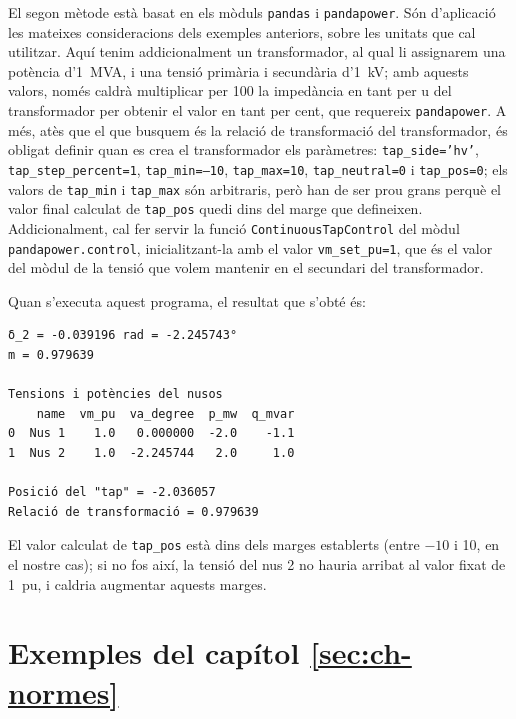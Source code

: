 El segon mètode està basat en els mòduls \texttt{pandas} i \texttt{pandapower}. Són d'aplicació les mateixes consideracions dels exemples anteriors, sobre les unitats que cal utilitzar. Aquí tenim addicionalment un transformador, al qual li assignarem una potència d'\qty{1}{MVA}, i una tensió primària i secundària d'\qty{1}{kV}; amb aquests valors, només caldrà multiplicar per 100 la impedància en tant per u  del transformador per obtenir el valor en tant per cent, que requereix \texttt{pandapower}. A més, atès que el que busquem és la relació de transformació del transformador, és obligat definir quan es crea el transformador els paràmetres: \texttt{tap\_side='hv'}, \texttt{tap\_step\_percent=1}, \texttt{tap\_min=--10}, \texttt{tap\_max=10}, \texttt{tap\_neutral=0} i  \texttt{tap\_pos=0}; els valors de \texttt{tap\_min} i \texttt{tap\_max} són arbitraris, però han de ser prou grans perquè el valor final calculat de \texttt{tap\_pos} quedi dins del marge que defineixen. Addicionalment, cal fer servir la funció \texttt{ContinuousTapControl} del mòdul \texttt{pandapower.control}, inicialitzant-la amb el valor \texttt{vm\_set\_pu=1}, que és el valor del mòdul de la tensió que volem mantenir en el secundari del transformador.




Quan s'executa aquest programa, el resultat que s'obté és:
\lstset{
	language=,
	numbers=none,
	frame=none
}
\begin{lstlisting}
δ_2 = -0.039196 rad = -2.245743°
m = 0.979639

Tensions i potències del nusos
    name  vm_pu  va_degree  p_mw  q_mvar
0  Nus 1    1.0   0.000000  -2.0    -1.1
1  Nus 2    1.0  -2.245744   2.0     1.0

Posició del "tap" = -2.036057
Relació de transformació = 0.979639
\end{lstlisting}

El valor calculat de \texttt{tap\_pos} està dins dels marges establerts (entre $-10$ i 10, en el nostre cas); si no fos així, la tensió del nus 2 no hauria arribat al valor fixat de \qty{1}{pu}, i caldria augmentar aquests marges.




\section{Exemples del capítol \ref*{sec:ch-normes}}

